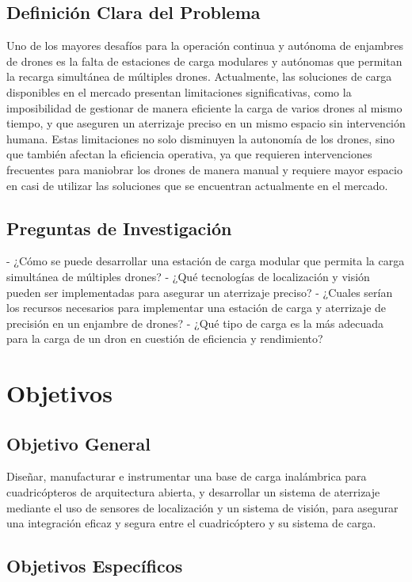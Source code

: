 \subsection{Definición Clara del Problema}

Uno de los mayores desafíos para la operación continua y autónoma de enjambres de drones es la falta de estaciones de carga modulares y autónomas que permitan la recarga simultánea de múltiples drones. Actualmente, las soluciones de carga disponibles en el mercado presentan limitaciones significativas, como la imposibilidad de gestionar de manera eficiente la carga de varios drones al mismo tiempo, y que aseguren un aterrizaje preciso en un mismo espacio sin intervención humana. Estas limitaciones no solo disminuyen la autonomía de los drones, sino que también afectan la eficiencia operativa, ya que requieren intervenciones frecuentes para maniobrar los drones de manera manual y requiere mayor espacio en casi de utilizar las soluciones que se encuentran actualmente en el mercado.
\subsection{Preguntas de Investigación}

- ¿Cómo se puede desarrollar una estación de carga modular que permita la carga simultánea de múltiples drones?
- ¿Qué tecnologías de localización y visión pueden ser implementadas para asegurar un aterrizaje preciso?
- ¿Cuales serían los recursos necesarios para implementar una estación de carga y aterrizaje de precisión en un enjambre de drones?
- ¿Qué tipo de carga es la más adecuada para la carga de un dron en cuestión de eficiencia y rendimiento?

\section{Objetivos}

\subsection{Objetivo General}

Diseñar, manufacturar e instrumentar una base de carga inalámbrica para cuadricópteros de arquitectura abierta, y desarrollar un sistema de aterrizaje mediante el uso de sensores de localización y un sistema de visión, para asegurar una integración eficaz y segura entre el cuadricóptero y su sistema de carga.

\subsection{Objetivos Específicos}

